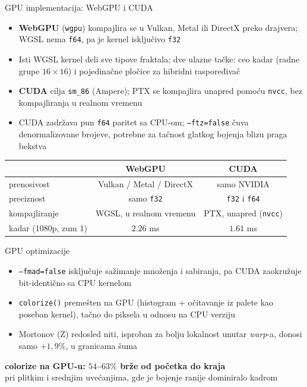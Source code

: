 \documentclass[aspectratio=169,11pt]{beamer}
\newcommand{\code}[1]{\texttt{\color{accent!80!black}#1}}
\begin{document}
\begin{frame}{GPU implementacija: WebGPU i CUDA}
  \begin{itemize}
    \item \textbf{WebGPU} (\code{wgpu}) kompajlira se u Vulkan, Metal ili DirectX preko drajvera; WGSL nema \code{f64}, pa je kernel isključivo \code{f32}
    \item Isti WGSL kernel deli sve tipove fraktala; dve ulazne tačke: ceo kadar (radne grupe $16{\times}16$) i pojedinačne pločice za hibridni raspoređivač
    \item \textbf{CUDA} cilja \code{sm\_86} (Ampere); PTX se kompajlira unapred pomoću \code{nvcc}, bez kompajliranja u realnom vremenu
    \item CUDA zadržava pun \code{f64} paritet sa CPU-om; \code{--ftz=false} čuva denormalizovane brojeve, potrebne za tačnost glatkog bojenja blizu praga bekstva
  \end{itemize}
  \vspace{0.3em}
  \begin{center}
  \small
  \begin{tabular}{lcc}
    \toprule
     & \textbf{WebGPU} & \textbf{CUDA} \\
    \midrule
    prenosivost & Vulkan / Metal / DirectX & samo NVIDIA \\
    preciznost & samo \code{f32} & \code{f32} i \code{f64} \\
    kompajliranje & WGSL, u realnom vremenu & PTX, unapred (\code{nvcc}) \\
    kadar (1080p, zum 1) & $2.26$ ms & $1.61$ ms \\
    \bottomrule
  \end{tabular}
  \end{center}
\end{frame}

\begin{frame}{GPU optimizacije}
  \begin{itemize}
    \item \code{--fmad=false} isključuje sažimanje množenja i sabiranja, pa CUDA zaokružuje bit-identično sa CPU kernelom
    \item \code{colorize()} premešten na GPU (histogram + očitavanje iz palete kao poseban kernel), tačno do piksela u odnosu na CPU verziju
    \item Mortonov (Z) redosled niti, isproban za bolju lokalnost unutar \emph{warp}-a, donosi samo $+1{,}9\%$, u granicama šuma
  \end{itemize}
  \vspace{0.3em}
  \begin{center}
    {\color{accent}\bfseries colorize na GPU-u: $54$--$63\%$ brže od početka do kraja} \\
    {\small\color{graytext} pri plitkim i srednjim uvećanjima, gde je bojenje ranije dominiralo kadrom}
  \end{center}
\end{frame}
\end{document}
